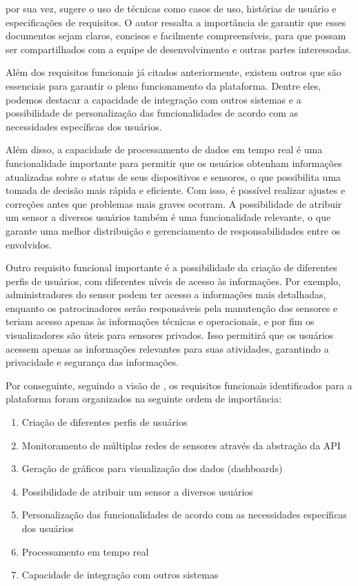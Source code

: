 \documentclass[tcc,capa]{texufpel}
\begin{document}
\citet{SOMMERVILLE:2011} por sua vez, sugere o uso de técnicas como casos de uso, histórias de usuário e especificações de requisitos. O autor ressalta a importância de garantir que esses documentos sejam claros, concisos e facilmente compreensíveis, para que possam ser compartilhados com a equipe de desenvolvimento e outras partes interessadas.

Além dos requisitos funcionais já citados anteriormente, existem outros que são essenciais para garantir o pleno funcionamento da plataforma. Dentre eles, podemos destacar a capacidade de integração com outros sistemas e a possibilidade de personalização das funcionalidades de acordo com as necessidades específicas dos usuários.

Além disso, a capacidade de processamento de dados em tempo real é uma funcionalidade importante para permitir que os usuários obtenham informações atualizadas sobre o status de seus dispositivos e sensores, o que possibilita uma tomada de decisão mais rápida e eficiente. Com isso, é possível realizar ajustes e correções antes que problemas mais graves ocorram. A possibilidade de atribuir um sensor a diversos usuários também é uma funcionalidade relevante, o que garante uma melhor distribuição e gerenciamento de responsabilidades entre os envolvidos.

Outro requisito funcional importante é a possibilidade da criação de diferentes perfis de usuários, com diferentes níveis de acesso às informações. Por exemplo, administradores do sensor podem ter acesso a informações mais detalhadas, enquanto os patrocinadores serão responsáveis pela manutenção dos sensores e teriam acesso apenas às informações técnicas e operacionais, e por fim os visualizadores são úteis para sensores privados. Isso permitirá que os usuários acessem apenas as informações relevantes para suas atividades, garantindo a privacidade e segurança das informações.

Por conseguinte, seguindo a visão de \citet{PRESSMAN:2016}, os requisitos funcionais identificados para a plataforma foram organizados na seguinte ordem de importância:
\begin{enumerate}
    \item Criação de diferentes perfis de usuários
    \item Monitoramento de múltiplas redes de sensores através da abstração da API
    \item Geração de gráficos para visualização dos dados (dashboards)
    \item Possibilidade de atribuir um sensor a diversos usuários
    \item Personalização das funcionalidades de acordo com as necessidades específicas dos usuários
    \item Processamento em tempo real
    \item Capacidade de integração com outros sistemas
\end{enumerate}
\end{document}
